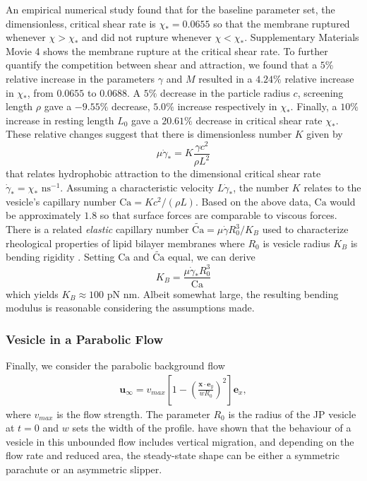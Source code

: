 \documentclass[lineno]{jfm}
\newcommand{\xx}{\mathbf{x}}
\newcommand{\uu}{\mathbf{u}}
\begin{document}
An empirical numerical study found that for the baseline
parameter set, the dimensionless, critical shear rate is $\chi_*=0.0655$
so that the membrane ruptured whenever $\chi > \chi_*$ and did not
rupture whenever $\chi < \chi_*.$ Supplementary Materials Movie 4 shows
the membrane rupture at the critical shear rate.  To further quantify
the competition between shear and attraction, we found that a $5 \%$
relative increase in the parameters $\gamma$ and $M$ resulted in a $4.24
\%$ relative increase in $\chi_*$, from $0.0655$ to $0.0688$.  A $5 \%$
decrease in the particle radius $c$, screening length $\rho$ gave a
$-9.55 \%$ decrease, $5.0 \%$ increase respectively in $\chi_*$.
Finally, a $10 \%$ increase in resting length $L_0$ gave a $20.61 \%$
decrease in critical shear rate $\chi_*$.  
These relative changes suggest that there is dimensionless number $K$ given by 
  \begin{equation}
    \label{eq:CSR}
  \mu \dot\gamma_* = K \frac{\gamma c^2}{\rho L^2}
  \end{equation}
  that relates hydrophobic attraction to the dimensional critical shear rate $\dot \gamma_* = \chi_* \text{ ns}^{-1}$.
  Assuming a characteristic velocity $L\dot \gamma_*$, the number $K$ relates to the vesicle's capillary number
  $\text{Ca} = K c^2/(\rho L)$. Based on the above data, $\text{Ca}$ would be approximately $1.8$
  so that surface forces are comparable to viscous forces.  
  There is a related \emph{elastic} capillary number
  $\widetilde{\text{Ca}} = \mu \dot{\gamma} R_0^3/K_B$
  used to characterize rheological properties of lipid bilayer membranes
  where $R_0$ is vesicle radius $K_B$ is bending rigidity \citep{VLAHOVSKA2009775, keller_skalak_1982}. 
  Setting $\text{Ca}$ and $\widetilde{\text{Ca}}$ equal, we can derive
  \[
  K_B = \frac{\mu \dot \gamma_* R_0^3}{\text{Ca}}
  \]
  which yields $K_B \approx 100$ pN $\text{nm}$.
  Albeit somewhat large, the resulting bending modulus is
  reasonable considering the assumptions made.

\subsubsection{Vesicle in a Parabolic Flow}
\label{sec:ves_in_parabolic}
Finally, we consider the parabolic background flow
\begin{align}
  \uu_\infty = v_{max}\left[ 1 - \left( 
    \frac{\xx \cdot \mathbf{e}_y}{wR_0}\right)^2
    \right]\mathbf{e}_x,
\end{align}
%
where $v_{max}$ is the flow strength. 
The parameter $R_0$ is the radius of the JP vesicle at $t=0$ and
$w$ sets the width of the profile. \cite{Kaoui09, cou-kao-pod-mis2008,
dan-vla-mis2009} have shown that the behaviour of a vesicle in this
unbounded flow includes vertical migration, and depending on the flow
rate and reduced area, the steady-state shape can be either a symmetric
parachute or an asymmetric slipper.
\end{document}
